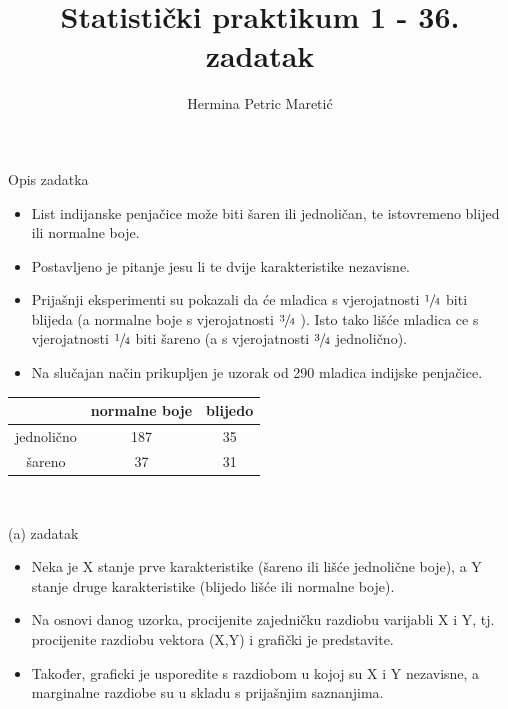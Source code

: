 \documentclass{beamer}
\title[Statistički praktikum 1 - 36. zadatak]{Statistički praktikum 1 - 36. zadatak}
\author{Hermina Petric Mareti\'{c}}
\begin{document}
\begin{frame}
\titlepage
\end{frame}

\begin{frame}{Opis zadatka}
\begin{itemize}
\item List indijanske penjačice može biti šaren ili jednoličan, te istovremeno blijed ili
normalne boje. 
\item Postavljeno je pitanje jesu li te dvije karakteristike nezavisne. 
\item Prijašnji eksperimenti su pokazali da će mladica s
vjerojatnosti $\sfrac{1}{4}$ biti blijeda (a normalne boje s vjerojatnosti $\sfrac{3}{4}$ ). Isto tako lišće mladica ce s
vjerojatnosti $\sfrac{1}{4}$ biti šareno (a s vjerojatnosti $\sfrac{3}{4}$ jednolično). 
\item Na slučajan način prikupljen je
uzorak od 290 mladica indijske penjačice.
\end{itemize}
\begin{center}
\begin{tabular}{|c|c|c|}
\hline 
 & normalne boje & blijedo \\ 
\hline 
jednolično & 187 & 35 \\ 
\hline 
šareno & 37 & 31 \\ 
\hline 
\end{tabular} \\
\end{center}
\end{frame}

\begin{frame}{(a) zadatak}
\begin{itemize}
\item Neka je X stanje prve karakteristike (šareno ili lišće jednolične boje), a Y stanje druge
karakteristike (blijedo lišće ili normalne boje). 
\item Na osnovi danog uzorka, procijenite zajedničku
razdiobu varijabli X i Y, tj. procijenite razdiobu vektora (X,Y) i grafički je predstavite.
\item Također, graficki je usporedite s razdiobom u kojoj su X i Y nezavisne, a marginalne razdiobe
su u skladu s prijašnjim saznanjima.
\end{itemize}
\end{frame}
\end{document}
